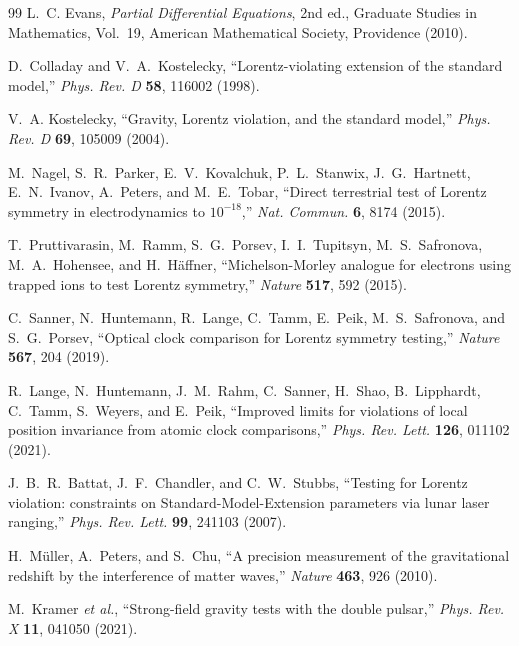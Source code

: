 \documentclass[pdflatex,sn-mathphys-num]{sn-jnl}%
\theoremstyle{thmstyleone}%
\theoremstyle{thmstyletwo}%
\theoremstyle{thmstylethree}%
\begin{document}
\begin{thebibliography}{99}
L.~C. Evans,
\textit{Partial Differential Equations}, 2nd ed.,
Graduate Studies in Mathematics, Vol.~19,
American Mathematical Society, Providence (2010).

D.~Colladay and V.~A.~Kostelecky,
``Lorentz-violating extension of the standard model,''
\textit{Phys. Rev. D} \textbf{58}, 116002 (1998).

V.~A. Kostelecky,
``Gravity, Lorentz violation, and the standard model,''
\textit{Phys. Rev. D} \textbf{69}, 105009 (2004).

M.~Nagel, S.~R.~Parker, E.~V.~Kovalchuk, P.~L.~Stanwix,
J.~G.~Hartnett, E.~N.~Ivanov, A.~Peters, and M.~E.~Tobar,
``Direct terrestrial test of Lorentz symmetry in
electrodynamics to $10^{-18}$,''
\textit{Nat. Commun.} \textbf{6}, 8174 (2015).

T.~Pruttivarasin, M.~Ramm, S.~G.~Porsev, I.~I.~Tupitsyn,
M.~S.~Safronova, M.~A.~Hohensee, and H.~H\"affner,
``Michelson-Morley analogue for electrons using trapped
ions to test Lorentz symmetry,''
\textit{Nature} \textbf{517}, 592 (2015).

C.~Sanner, N.~Huntemann, R.~Lange, C.~Tamm, E.~Peik,
M.~S.~Safronova, and S.~G.~Porsev,
``Optical clock comparison for Lorentz symmetry testing,''
\textit{Nature} \textbf{567}, 204 (2019).

R.~Lange, N.~Huntemann, J.~M.~Rahm, C.~Sanner, H.~Shao,
B.~Lipphardt, C.~Tamm, S.~Weyers, and E.~Peik,
``Improved limits for violations of local position invariance
from atomic clock comparisons,''
\textit{Phys. Rev. Lett.} \textbf{126}, 011102 (2021).

J.~B.~R.~Battat, J.~F.~Chandler, and C.~W.~Stubbs,
``Testing for Lorentz violation: constraints on
Standard-Model-Extension parameters via lunar laser
ranging,''
\textit{Phys. Rev. Lett.} \textbf{99}, 241103 (2007).

H.~M\"uller, A.~Peters, and S.~Chu,
``A precision measurement of the gravitational redshift by
the interference of matter waves,''
\textit{Nature} \textbf{463}, 926 (2010).

M.~Kramer \textit{et al.},
``Strong-field gravity tests with the double pulsar,''
\textit{Phys. Rev. X} \textbf{11}, 041050 (2021).

\end{thebibliography}
\end{document}
